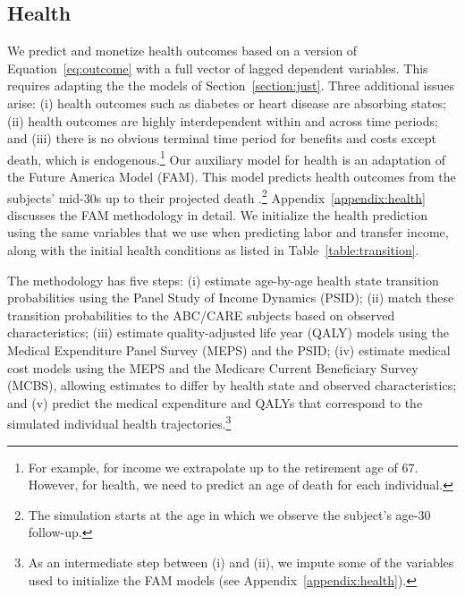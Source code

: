\subsection{Health} \label{section:health}

 We predict and monetize health outcomes based on a version of Equation~\eqref{eq:outcome} with a full vector of lagged dependent variables. This requires adapting the the models of Section~\ref{section:just}. Three additional issues arise: (i) health outcomes such as diabetes or heart disease are absorbing states; (ii) health outcomes are highly interdependent within and across time periods; and (iii) there is no obvious terminal time period for benefits and costs except death, which is endogenous.\footnote{For example, for income we extrapolate up to the retirement age of 67. However, for health, we need to predict an age of death for each individual.} Our auxiliary model for health is an adaptation of the Future America Model (FAM). This model predicts health outcomes from the subjects' mid-30s up to their projected death \citep{Goldman_etal_2015_Future-Elderly-Model-Report}.\footnote{The simulation starts at the age in which we observe the subject's age-30 follow-up.} Appendix~\ref{appendix:health} discusses the FAM methodology in detail. We initialize the health prediction using the same variables that we use when predicting labor and transfer income, along with the initial health conditions as listed in Table~\ref{table:transition}.

The methodology has five steps: (i) estimate age-by-age health state transition probabilities using the Panel Study of Income Dynamics (PSID); (ii) match these transition probabilities to the ABC/CARE subjects based on observed characteristics; (iii) estimate quality-adjusted life year (QALY) models using the Medical Expenditure Panel Survey (MEPS) and the PSID; (iv) estimate medical cost models using the MEPS and the Medicare Current Beneficiary Survey (MCBS), allowing estimates to differ by health state and observed characteristics; and (v) predict the medical expenditure and QALYs that correspond to the simulated individual health trajectories.\footnote{As an intermediate step between (i) and (ii), we impute some of the variables used to initialize the FAM models (see Appendix~\ref{appendix:health}).}

